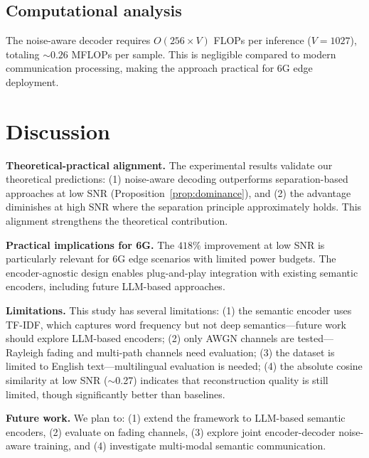 \documentclass[a4paper,fleqn]{cas-sc}
\begin{document}
\subsection{Computational analysis}

The noise-aware decoder requires $O(256 \times V)$ FLOPs per inference ($V = 1027$), totaling $\sim$$0.26$ MFLOPs per sample. This is negligible compared to modern communication processing, making the approach practical for 6G edge deployment.


\section{Discussion}\label{sec:discussion}

\textbf{Theoretical-practical alignment.} The experimental results validate our theoretical predictions: (1) noise-aware decoding outperforms separation-based approaches at low SNR (Proposition~\ref{prop:dominance}), and (2) the advantage diminishes at high SNR where the separation principle approximately holds. This alignment strengthens the theoretical contribution.

\textbf{Practical implications for 6G.} The $418\%$ improvement at low SNR is particularly relevant for 6G edge scenarios with limited power budgets. The encoder-agnostic design enables plug-and-play integration with existing semantic encoders, including future LLM-based approaches.

\textbf{Limitations.} This study has several limitations: (1) the semantic encoder uses TF-IDF, which captures word frequency but not deep semantics---future work should explore LLM-based encoders; (2) only AWGN channels are tested---Rayleigh fading and multi-path channels need evaluation; (3) the dataset is limited to English text---multilingual evaluation is needed; (4) the absolute cosine similarity at low SNR ($\sim$0.27) indicates that reconstruction quality is still limited, though significantly better than baselines.

\textbf{Future work.} We plan to: (1) extend the framework to LLM-based semantic encoders, (2) evaluate on fading channels, (3) explore joint encoder-decoder noise-aware training, and (4) investigate multi-modal semantic communication.


\end{document}
